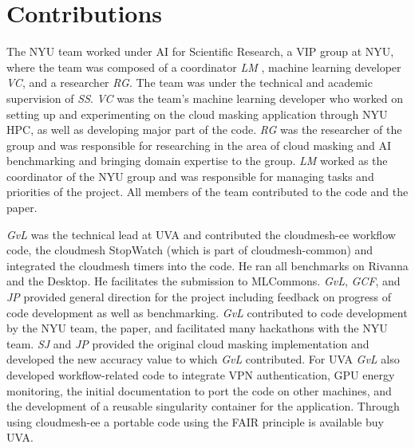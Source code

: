 \documentclass[sigplan,screen]{acmart}
\begin{document}


\section*{Contributions}

The NYU team worked under AI for Scientific Research, a VIP group at NYU, where the team was composed of a coordinator {\em LM} , machine learning developer {\em VC}, and a researcher {\em RG}. The team was under the technical and academic supervision of {\em SS}. {\em VC} was the team’s machine learning developer who worked on setting up and experimenting on the cloud masking application through NYU HPC, as well as developing major part of the code. {\em RG} was the researcher of the group and was responsible for researching in the area of cloud masking and AI benchmarking and bringing domain expertise to the group. {\em LM}  worked as the coordinator of the NYU group and was responsible for managing tasks and priorities of the project. All members of the team contributed to the code and the paper. 

{\em GvL} was the technical lead  at UVA and contributed the cloudmesh-ee workflow code, the cloudmesh StopWatch (which is part of cloudmesh-common) and integrated the cloudmesh timers into the code. He ran all benchmarks on Rivanna and the Desktop.  He  facilitates the submission to MLCommons. {\em GvL}, {\em GCF}, and {\em JP} provided general direction for the project including  feedback on progress of code development as well as benchmarking. {\em GvL} contributed to code development by the NYU team, the paper, and facilitated many hackathons with the NYU team. {\em SJ} and {\em JP} provided the  original cloud masking implementation and developed the new accuracy value to which {\em GvL} contributed. For UVA {\em GvL} also developed workflow-related code to integrate VPN authentication, GPU energy monitoring, the initial documentation to port the code on other machines, and the development of a reusable singularity container for the application. Through using cloudmesh-ee a portable code using the FAIR principle is available buy UVA.
\end{document}
